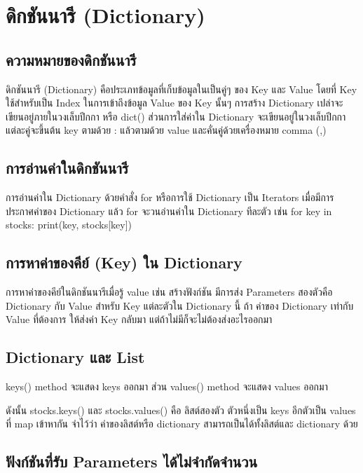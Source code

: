 \chapter{ดิกชันนารี (Dictionary)}
\section{ความหมายของดิกชันนารี}

ดิกชันนารี (Dictionary) คือประเภทข้อมูลที่เก็บข้อมูลในเป็นคู่ๆ ของ Key และ Value โดยที่ Key ใช้สำหรับเป็น Index ในการเข้าถึงข้อมูล Value ของ Key นั้นๆ การสร้าง Dictionary เปล่าจะเขียนอยู่ภายในวงเล็บปีกกา { } หรือ dict() ส่วนการใส่ค่าใน Dictionary จะเขียนอยู่ในวงเล็บปีกกา แต่ละคู่จะขึ้นต้น key ตามด้วย : แล้วตามด้วย value และคั่นคู่ด้วยเครื่องหมาย comma (,) 

\section{การอ่านค่าในดิกชันนารี}

การอ่านค่าใน Dictionary ด้วยคำสั่ง for หรือการใช้ Dictionary เป็น Iterators เมื่อมีการประกาศค่าของ Dictionary แล้ว for จะวนอ่านค่าใน Dictionary ทีละตัว เช่น for key in stocks: print(key, stocks[key])

\section{การหาค่าของคีย์ (Key) ใน Dictionary}
การหาค่าของคีย์ในดิกชันนารีเมื่อรู้ value เช่น สร้างฟังก์ชัน  มีการส่ง Parameters สองตัวคือ Dictionary กับ Value สำหรับ Key แต่ละตัวใน Dictionary นี้ ถ้า ค่าของ Dictionary เท่ากับ Value ที่ต้องการ ให้ส่งค่า Key กลับมา แต่ถ้าไม่มีก็จะไม่ต้องส่งอะไรออกมา

\section{Dictionary และ List}

keys() method จะแสดง keys ออกมา ส่วน values() method จะแสดง values ออกมา 

ดังนั้น stocks.keys() และ stocks.values() คือ ลิสต์สองตัว ตัวหนึ่งเป็น keys อีกตัวเป็น values ที่ map เข้าหากัน จำไว้ว่า ค่าของลิสต์หรือ dictionary สามารถเป็นได้ทั้งลิสต์และ dictionary ด้วย

\section{ฟังก์ชันที่รับ Parameters ได้ไม่จำกัดจำนวน }

